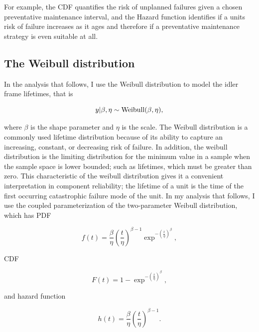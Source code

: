 For example, the CDF quantifies the risk of unplanned failures given a chosen preventative maintenance interval, and the Hazard function identifies if a units risk of failure increases as it ages and therefore if a preventative maintenance strategy is even suitable at all.

\subsection{The Weibull distribution}

In the analysis that follows, I use the Weibull distribution to model the idler frame lifetimes, that is

\begin{equation}
    y|\beta, \eta \sim \hbox{Weibull}(\beta, \eta),
\end{equation}

where $\beta$ is the shape parameter and $\eta$ is the scale. The Weibull distribution is a commonly used lifetime distribution because of its ability to capture an increasing, constant, or decreasing risk of failure. In addition, the weibull distribution is the limiting distribution for the minimum value in a sample when the sample space is lower bounded; such as lifetimes, which must be greater than zero. This characteristic of the weibull distribution gives it a convenient interpretation in component reliability; the lifetime of a unit is the time of the first occurring catastrophic failure mode of the unit. In my analysis that follows, I use the coupled parameterization of the two-parameter Weibull distribution, which has PDF

\begin{equation}
    f(t) = \frac{\beta}{\eta}\left(\frac{t}{\eta}\right)^{\beta - 1} \exp^{-\left(\frac{t}{\eta}\right)^{\beta}},
\end{equation}

CDF

\begin{equation}
    F(t) = 1 - \exp^{-\left(\frac{t}{\eta}\right)^{\beta}},
\end{equation}

and hazard function

\begin{equation}
    h(t) = \frac{\beta}{\eta}\left(\frac{t}{\eta}\right)^{\beta - 1}.
\end{equation}

